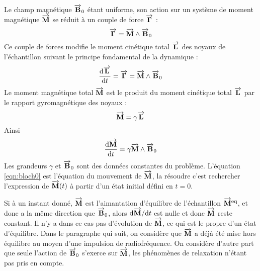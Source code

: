 Le champ magnétique $\overrightarrow{\mathbf{B}}_0$ étant uniforme,
son action sur un système de moment magnétique $\overrightarrow{\mathbf{M}}$
se réduit à un couple de force $\overrightarrow{\mathbf{\Gamma}}$ :
\begin{equation}
\overrightarrow{\mathbf{\Gamma}} = \overrightarrow{\mathbf{M}} \wedge \overrightarrow{\mathbf{B}}_0
\end{equation}
Ce couple de forces modifie le moment cinétique total
$\overrightarrow{\mathbf{L}}$ des noyaux de l'échantillon
suivant le principe fondamental de la dynamique :
\begin{equation}
\frac{\mbox{d}\overrightarrow{\mathbf{L}}}{\mbox{d} t} = \overrightarrow{\mathbf{\Gamma}} = \overrightarrow{\mathbf{M}} \wedge \overrightarrow{\mathbf{B}}_0
\end{equation}
Le moment magnétique total $\overrightarrow{\mathbf{M}}$ est le produit du moment
cinétique total $\overrightarrow{\mathbf{L}}$ par le rapport
gyromagnétique des noyaux :
\begin{equation}
\overrightarrow{\mathbf{M}} = \gamma \overrightarrow{\mathbf{L}}
\end{equation}
Ainsi
\begin{equation}
\label{eqn:bloch0}
\frac{\mbox{d}\overrightarrow{\mathbf{M}}}{\mbox{d} t} = \gamma \overrightarrow{\mathbf{M}} \wedge \overrightarrow{\mathbf{B}}_0
\end{equation}
Les grandeurs $\gamma$ et $\overrightarrow{\mathbf{B}}_0$ sont des données
constantes du problème.
L'équation \ref{eqn:bloch0} est l'équation du mouvement de
$\overrightarrow{\mathbf{M}}$, la résoudre c'est rechercher
l'expression de $\overrightarrow{\mathbf{M}} (t)$ à partir d'un état initial défini en $t=0$.

Si à un instant donné, $\overrightarrow{\mathbf{M}}$ est l'aimantation d'équilibre
de l'échantillon $\overrightarrow{\mathbf{M}}^{\mbox{\footnotesize{eq}}}$, et donc a la même
direction que $\overrightarrow{\mathbf{B}}_0$,
alors $\mbox{d}\overrightarrow{\mathbf{M}}/\mbox{d}t$ est nulle et donc $\overrightarrow{\mathbf{M}}$ reste constant.
Il n'y a dans ce cas pas d'évolution de $\overrightarrow{\mathbf{M}}$, ce qui est
le propre d'un état d'équilibre.
Dans le paragraphe qui suit, on considère que $\overrightarrow{\mathbf{M}}$
a déjà été mise hors équilibre au moyen d'une impulsion de
radiofréquence.
On considère d'autre part que seule l'action de $\overrightarrow{\mathbf{B}}_0$
s'exerce sur $\overrightarrow{\mathbf{M}}$,
les phénomènes de relaxation n'étant pas pris en compte.

